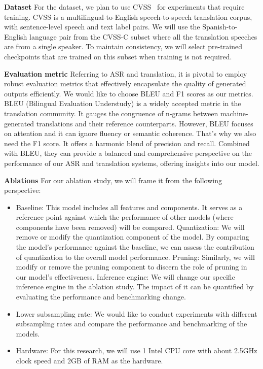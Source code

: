 \documentclass[11pt]{article}
\begin{document}
\textbf{Dataset}
For the dataset, we plan to use CVSS~\cite{CVSS} for experiments that require training. CVSS is a multilingual-to-English speech-to-speech translation corpus, with sentence-level speech and text label pairs. We will use the Spanish-to-English language pair from the CVSS-C subset where all the translation speeches are from a single speaker. To maintain consistency, we will select pre-trained checkpoints that are trained on this subset when training is not required.

\textbf{Evaluation metric}
Referring to ASR and translation, it is pivotal to employ robust evaluation metrics that effectively encapsulate the quality of generated outputs efficiently. We would like to choose BLEU and F1 scores as our metrics. BLEU (Bilingual Evaluation Understudy) is a widely accepted metric in the translation community. It gauges the congruence of n-grams between machine-generated translations and their reference counterparts. However, BLEU focuses on attention and it can ignore fluency or semantic coherence. That’s why we also need the F1 score. It offers a harmonic blend of precision and recall. Combined with BLEU, they can provide a balanced and comprehensive perspective on the performance of our ASR and translation systems, offering insights into our model.

\textbf{Ablations}
For our ablation study, we will frame it from the following perspective:
\begin{itemize}
  \item Baseline: 
  This model includes all features and components. It serves as a reference point against which the performance of other models (where components have been removed) will be compared.
Quantization: We will remove or modify the quantization component of the model. By comparing the model’s performance against the baseline, we can assess the contribution of quantization to the overall model performance.
Pruning: Similarly, we will modify or remove the pruning component to discern the role of pruning in our model’s effectiveness.
Inference engine: We will change our specific inference engine in the ablation study. The impact of it can be quantified by evaluating the performance and benchmarking change.
  \item Lower subsampling rate: We would like to conduct experiments with different subsampling rates and compare the performance and benchmarking of the models.
  \item Hardware: For this research, we will use 1 Intel CPU core with about 2.5GHz clock speed and 2GB of RAM as the hardware.
\end{itemize}
\end{document}
